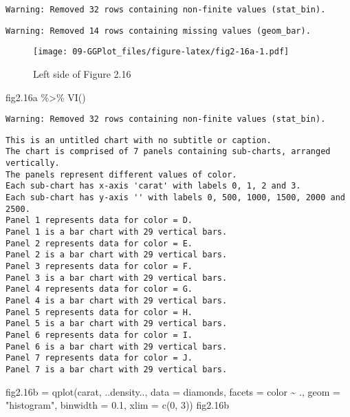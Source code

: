 \documentclass[
]{book}
\newenvironment{Shaded}{\begin{snugshade}}{\end{snugshade}}
\newcommand{\AttributeTok}[1]{\textcolor[rgb]{0.77,0.63,0.00}{#1}}
\newcommand{\DecValTok}[1]{\textcolor[rgb]{0.00,0.00,0.81}{#1}}
\newcommand{\FloatTok}[1]{\textcolor[rgb]{0.00,0.00,0.81}{#1}}
\newcommand{\FunctionTok}[1]{\textcolor[rgb]{0.00,0.00,0.00}{#1}}
\newcommand{\NormalTok}[1]{#1}
\newcommand{\OtherTok}[1]{\textcolor[rgb]{0.56,0.35,0.01}{#1}}
\newcommand{\SpecialCharTok}[1]{\textcolor[rgb]{0.00,0.00,0.00}{#1}}
\newcommand{\StringTok}[1]{\textcolor[rgb]{0.31,0.60,0.02}{#1}}
\begin{document}
\begin{verbatim}
Warning: Removed 32 rows containing non-finite values (stat_bin).
\end{verbatim}

\begin{verbatim}
Warning: Removed 14 rows containing missing values (geom_bar).
\end{verbatim}

\begin{figure}
\centering
\texttt{[image: 09-GGPlot\_files/figure-latex/fig2-16a-1.pdf]}
\caption{\label{fig:fig2-16a}Left side of Figure 2.16}
\end{figure}

\begin{Shaded}
\begin{Highlighting}[]
\NormalTok{fig2}\FloatTok{.16}\NormalTok{a }\SpecialCharTok{\%\textgreater{}\%} \FunctionTok{VI}\NormalTok{()   }
\end{Highlighting}
\end{Shaded}

\begin{verbatim}
Warning: Removed 32 rows containing non-finite values (stat_bin).
\end{verbatim}

\begin{verbatim}
This is an untitled chart with no subtitle or caption.
The chart is comprised of 7 panels containing sub-charts, arranged vertically.
The panels represent different values of color.
Each sub-chart has x-axis 'carat' with labels 0, 1, 2 and 3.
Each sub-chart has y-axis '' with labels 0, 500, 1000, 1500, 2000 and 2500.
Panel 1 represents data for color = D.
Panel 1 is a bar chart with 29 vertical bars.
Panel 2 represents data for color = E.
Panel 2 is a bar chart with 29 vertical bars.
Panel 3 represents data for color = F.
Panel 3 is a bar chart with 29 vertical bars.
Panel 4 represents data for color = G.
Panel 4 is a bar chart with 29 vertical bars.
Panel 5 represents data for color = H.
Panel 5 is a bar chart with 29 vertical bars.
Panel 6 represents data for color = I.
Panel 6 is a bar chart with 29 vertical bars.
Panel 7 represents data for color = J.
Panel 7 is a bar chart with 29 vertical bars.
\end{verbatim}

\begin{Shaded}
\begin{Highlighting}[]
\NormalTok{fig2}\FloatTok{.16}\NormalTok{b }\OtherTok{=} \FunctionTok{qplot}\NormalTok{(carat, ..density.., }\AttributeTok{data =}\NormalTok{ diamonds, }\AttributeTok{facets =}\NormalTok{ color }\SpecialCharTok{\textasciitilde{}}\NormalTok{ ., }\AttributeTok{geom =} \StringTok{"histogram"}\NormalTok{, }\AttributeTok{binwidth =} \FloatTok{0.1}\NormalTok{, }\AttributeTok{xlim =} \FunctionTok{c}\NormalTok{(}\DecValTok{0}\NormalTok{, }\DecValTok{3}\NormalTok{))   }
\NormalTok{fig2}\FloatTok{.16}\NormalTok{b}
\end{Highlighting}
\end{Shaded}
\end{document}
